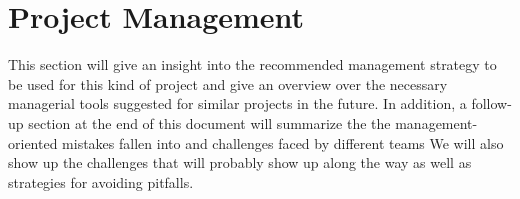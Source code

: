 \section{Project Management}
This section will give an insight into the recommended management strategy to be used for this kind of project and give an overview over the necessary managerial tools suggested for similar projects in the future.
In addition, a follow-up section at the end of this document will summarize the the management-oriented mistakes fallen into and challenges faced by different teams
We will also show up the challenges that will probably show up along the way as well as strategies for avoiding pitfalls.

